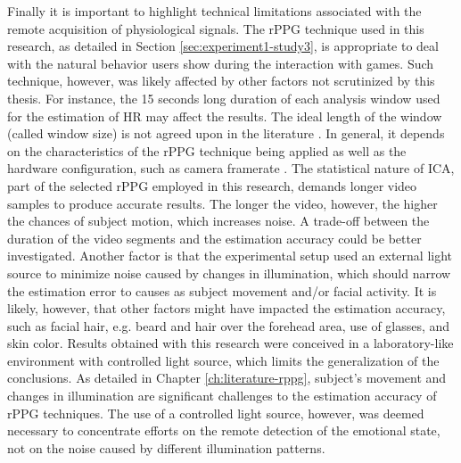 Finally it is important to highlight technical limitations associated with the remote acquisition of physiological signals. The rPPG technique used in this research, as detailed in Section \ref{sec:experiment1-study3}, is appropriate to deal with the natural behavior users show during the interaction with games. Such technique, however, was likely affected by other factors not scrutinized by this thesis. For instance, the 15 seconds long duration of each analysis window used for the estimation of HR may affect the results. The ideal length of the window (called window size) is not agreed upon in the literature \parencite{rouast2016remote}. In general, it depends on the characteristics of the rPPG technique being applied as well as the hardware configuration, such as camera framerate \parencite{roald2013estimation}. The statistical nature of ICA, part of the selected rPPG employed in this research, demands longer video samples to produce accurate results. The longer the video, however, the higher the chances of subject motion, which increases noise. A trade-off between the duration of the video segments and the estimation accuracy could be better investigated. Another factor is that the experimental setup used an external light source to minimize noise caused by changes in illumination, which should narrow the estimation error to causes as subject movement and/or facial activity. It is likely, however, that other factors might have impacted the estimation accuracy, such as facial hair, e.g. beard and hair over the forehead area, use of glasses, and skin color. Results obtained with this research were conceived in a laboratory-like environment with controlled light source, which limits the generalization of the conclusions. As detailed in Chapter \ref{ch:literature-rppg}, subject's movement and changes in illumination are significant challenges to the estimation accuracy of rPPG techniques. The use of a controlled light source, however, was deemed necessary to concentrate efforts on the remote detection of the emotional state, not on the noise caused by different illumination patterns.

